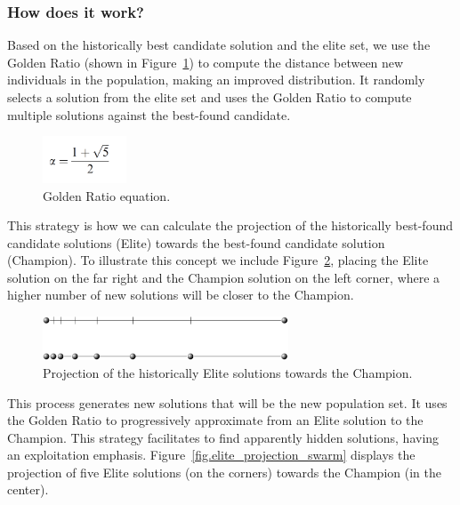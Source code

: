 \documentclass[graybox]{svmult}
\begin{document}
        \subsubsection{How does it work?} Based on the historically best candidate
        solution and the elite set, we use the Golden Ratio (shown in
        Figure~\ref{fig.golden_ratio}) to compute the distance between new individuals
        in the population, making an improved distribution. It randomly selects a
        solution from the elite set and uses the Golden Ratio to compute multiple
        solutions against the best-found candidate.

        \begin{figure}
            \centering
            \includegraphics[width=25mm]{img/fig_golden_ratio.pdf}
            \caption{Golden Ratio equation.} \label{fig.golden_ratio}
            \end{figure}

        This strategy is how we can calculate the projection of the historically
        best-found candidate solutions (Elite) towards the best-found candidate
        solution (Champion). To illustrate this concept we include
        Figure~\ref{fig.elite_projection}, placing the Elite solution on the far right
        and the Champion solution on the left corner, where a higher number of new
        solutions will be closer to the Champion.

        \begin{figure}
            \centering
            \includegraphics[width=0.65\textwidth]{img/fig_elite_projection.pdf}
            \caption{Projection of the historically Elite solutions towards the Champion.} \label{fig.elite_projection}
            \end{figure}

        This process generates new solutions that will be the new population set. It
        uses the Golden Ratio to progressively approximate from an Elite solution to
        the Champion. This strategy facilitates to find apparently hidden solutions,
        having an exploitation emphasis. Figure~\ref{fig.elite_projection_swarm}
        displays the projection of five Elite solutions (on the corners) towards the
        Champion (in the center).
\end{document}
